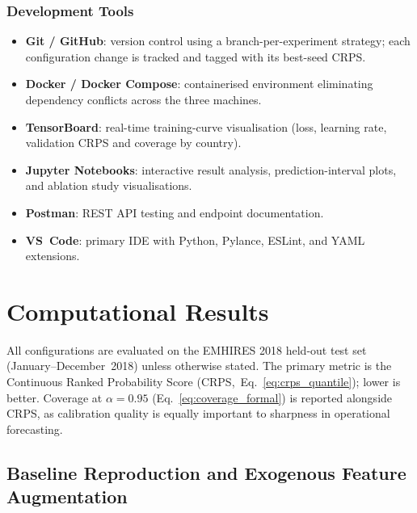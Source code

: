 \subsubsection{Development Tools}
\label{subsubsec:devtools}

\begin{itemize}
  \item \textbf{Git / GitHub}: version control using a
        branch-per-experiment strategy; each configuration change is
        tracked and tagged with its best-seed CRPS.
  \item \textbf{Docker / Docker Compose}: containerised environment
        eliminating dependency conflicts across the three machines.
  \item \textbf{TensorBoard}: real-time training-curve visualisation
        (loss, learning rate, validation CRPS and coverage by country).
  \item \textbf{Jupyter Notebooks}: interactive result analysis,
        prediction-interval plots, and ablation study visualisations.
  \item \textbf{Postman}: REST API testing and endpoint documentation.
  \item \textbf{VS~Code}: primary IDE with Python, Pylance, ESLint,
        and YAML extensions.
\end{itemize}

\section{Computational Results}
\label{sec:comp_results}

All configurations are evaluated on the EMHIRES 2018 held-out test set
(January--December~2018) unless otherwise stated.
The primary metric is the Continuous Ranked Probability Score
(CRPS,~Eq.~\ref{eq:crps_quantile}); lower is better.
Coverage at $\alpha{=}0.95$ (Eq.~\ref{eq:coverage_formal}) is reported
alongside CRPS, as calibration quality is equally important to sharpness
in operational forecasting.

\subsection{Baseline Reproduction and Exogenous Feature Augmentation}
\label{subsec:baseline_exog}

